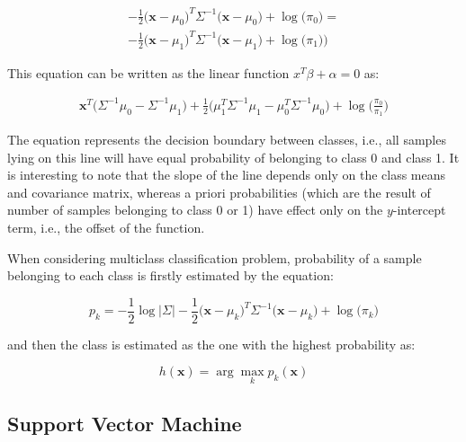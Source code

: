 \documentclass{article}
\newcommand{\argmax}{\arg\!\max} %
\begin{document}
\begin{equation} 
\begin{split}
-\frac{1}{2}  \Big(\mathbf{x}-\mu_0\Big)^T  \Sigma^{-1} \Big(\mathbf{x}-\mu_0\Big) +  \log{\Big(\pi_0\Big)}= \\
-\frac{1}{2}  \Big(\mathbf{x}-\mu_1\Big)^T  \Sigma^{-1} \Big(\mathbf{x}-\mu_1\Big) +  \log{\Big(\pi_1)\Big)}
\end{split}
\end{equation}

This equation can be written as the linear function $x^T\beta + \alpha = 0$ as:

\begin{equation} 
\begin{split}
\mathbf{x}^T\Big(\Sigma^{-1} \mu_0 - \Sigma^{-1} \mu_1\Big) + \frac{1}{2} \Big(\mu_1^T \Sigma^{-1}\mu_1 - \mu_0^T \Sigma^{-1}\mu_0\Big)
+ \log\Big( \frac{\pi_0}{\pi_1}  \Big)
\end{split}
\end{equation}

The equation represents the decision boundary between classes, i.e., all samples lying on this line will have equal probability of belonging to class 0 and class 1. It is interesting to note that the slope of the line depends only on the class means and covariance matrix, whereas a priori probabilities (which are the result of number of samples belonging to class 0 or 1) have effect only on the $y$-intercept term, i.e., the offset of the function.

When considering multiclass classification problem, probability of a sample belonging to each class is firstly estimated by the equation:

\begin{equation}
p_k = -\frac{1}{2} \log \big\vert \Sigma \big\vert - \frac{1}{2}  \Big(\mathbf{x}-\mu_k\Big)^T  \Sigma^{-1} \Big(\mathbf{x}-\mu_k\Big) +  \log{\Big(\pi_k\Big)}
\end{equation}

and then the class is estimated as the one with the highest probability as:

\begin{equation} 
h(\mathbf{x}) = \argmax_k p_k(\mathbf{x})
\end{equation}


\subsection{Support Vector Machine}
\end{document}
